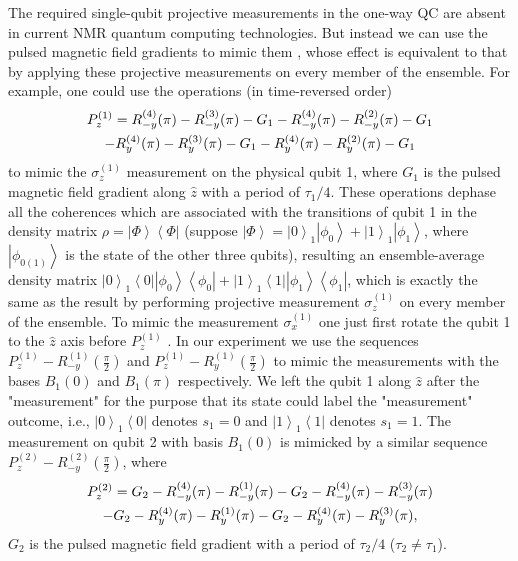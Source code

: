 \documentclass[showpacs,superscriptaddress,twocolumn,prl]{revtex4}
\begin{document}
The required single-qubit projective measurements in the one-way QC are
absent in current NMR quantum computing technologies. But instead we can use
the pulsed magnetic field gradients to mimic them \cite{measure}, whose
effect is equivalent to that by applying these projective measurements on
every member of the ensemble. For example, one could use the operations (in
time-reversed order)%
\begin{gather}
P_{z}^{(1)}=R_{-y}^{(4)}(\pi )-R_{-y}^{(3)}(\pi )-G_{1}-R_{-y}^{(4)}(\pi
)-R_{-y}^{(2)}(\pi )-G_{1}  \notag \\
-R_{y}^{(4)}(\pi )-R_{y}^{(3)}(\pi )-G_{1}-R_{y}^{(4)}(\pi )-R_{y}^{(2)}(\pi
)-G_{1}
\end{gather}%
to mimic the $\sigma _{z}^{(1)}$ measurement on the physical qubit 1, where $%
G_{1}$ is the pulsed magnetic field gradient along $\hat{z}$ with a period
of $\tau _{1}/4$. These operations dephase all the coherences which are
associated with the transitions of qubit 1 in the density matrix $\rho
=\left\vert \Phi \right\rangle \left\langle \Phi \right\vert $ (suppose $%
\left\vert \Phi \right\rangle =\left\vert 0\right\rangle _{1}\left\vert \phi
_{0}\right\rangle +\left\vert 1\right\rangle _{1}\left\vert \phi
_{1}\right\rangle $, where $\left\vert \phi _{0(1)}\right\rangle $ is the
state of the other three qubits), resulting an ensemble-average density
matrix $\left\vert 0\right\rangle _{1}\left\langle 0\right\vert \left\vert
\phi _{0}\right\rangle \left\langle \phi _{0}\right\vert +\left\vert
1\right\rangle _{1}\left\langle 1\right\vert \left\vert \phi
_{1}\right\rangle \left\langle \phi _{1}\right\vert $, which is exactly the
same as the result by performing projective measurement $\sigma _{z}^{(1)}$
on every member of the ensemble. To mimic the measurement $\sigma _{x}^{(1)}$
one just first rotate the qubit 1 to the $\hat{z}$ axis before $P_{z}^{(1)}$%
. In our experiment we use the sequences $P_{z}^{(1)}-R_{-y}^{(1)}(\frac{\pi
}{2})$ and $P_{z}^{(1)}-R_{y}^{(1)}(\frac{\pi }{2})$ to mimic the
measurements with the bases $B_{1}(0)$ and $B_{1}(\pi )$ respectively. We
left the qubit 1 along $\hat{z}$ after the "measurement" for the purpose
that its state could label the "measurement" outcome, i.e., $\left\vert
0\right\rangle _{1}\left\langle 0\right\vert $ denotes $s_{1}=0$ and $%
\left\vert 1\right\rangle _{1}\left\langle 1\right\vert $ denotes $s_{1}=1$.
The measurement on qubit 2 with basis $B_{1}(0)$ is mimicked by a similar
sequence $P_{z}^{(2)}-R_{-y}^{(2)}(\frac{\pi }{2})$, where%
\begin{gather}
P_{z}^{(2)}=G_{2}-R_{-y}^{(4)}(\pi )-R_{-y}^{(1)}(\pi
)-G_{2}-R_{-y}^{(4)}(\pi )-R_{-y}^{(3)}(\pi )  \notag \\
-G_{2}-R_{y}^{(4)}(\pi )-R_{y}^{(1)}(\pi )-G_{2}-R_{y}^{(4)}(\pi
)-R_{y}^{(3)}(\pi ),
\end{gather}%
$G_{2}$ is the pulsed magnetic field gradient with a period of $\tau _{2}/4$
($\tau _{2}\neq \tau _{1}$).
\end{document}
